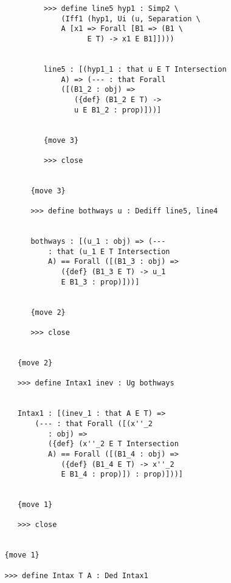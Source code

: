 \documentclass[12pt]{article}
\begin{document}
\begin{verbatim}
            >>> define line5 hyp1 : Simp2 \
                (Iff1 (hyp1, Ui (u, Separation \
                A [x1 => Forall [B1 => (B1 \
                      E T) -> x1 E B1]])))


            line5 : [(hyp1_1 : that u E T Intersection 
                A) => (--- : that Forall 
                ([(B1_2 : obj) => 
                   ({def} (B1_2 E T) -> 
                   u E B1_2 : prop)]))]


            {move 3}

            >>> close


         {move 3}

         >>> define bothways u : Dediff line5, line4


         bothways : [(u_1 : obj) => (--- 
             : that (u_1 E T Intersection 
             A) == Forall ([(B1_3 : obj) => 
                ({def} (B1_3 E T) -> u_1 
                E B1_3 : prop)]))]


         {move 2}

         >>> close


      {move 2}

      >>> define Intax1 inev : Ug bothways


      Intax1 : [(inev_1 : that A E T) => 
          (--- : that Forall ([(x''_2 
             : obj) => 
             ({def} (x''_2 E T Intersection 
             A) == Forall ([(B1_4 : obj) => 
                ({def} (B1_4 E T) -> x''_2 
                E B1_4 : prop)]) : prop)]))]


      {move 1}

      >>> close


   {move 1}

   >>> define Intax T A : Ded Intax1



\end{verbatim}
\end{document}
